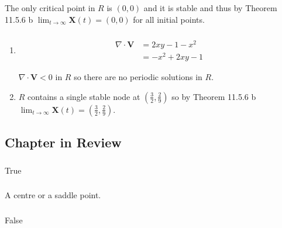 \documentclass{article}
\begin{document}
The only critical point in $R$ is $(0, 0)$ and it is stable and thus by Theorem 11.5.6 b $\lim_{t \rightarrow \infty} \mathbf{X}(t) = (0, 0)$ for all initial points.

\setcounter{subsubsection}{20}
\subsubsection{}

\begin{enumerate}
  \item

        \begin{align*}
          \nabla \cdot \mathbf{V} & = 2 x y - 1 - x^2  \\
                                  & = -x^2 + 2 x y - 1
        \end{align*}

        $\nabla \cdot \mathbf{V} < 0$ in $R$ so there are no periodic solutions in $R$.

  \item $R$ contains a single stable node at $\left( \frac{3}{2}, \frac{2}{9} \right)$ so by Theorem 11.5.6 b \\ $\lim_{t \rightarrow \infty} \mathbf{X}(t) = \left( \frac{3}{2}, \frac{2}{9} \right)$.
\end{enumerate}

\subsection{Chapter in Review}

\subsubsection{}

True

\setcounter{subsubsection}{2}
\subsubsection{}

A centre or a saddle point.

\setcounter{subsubsection}{4}
\subsubsection{}

False

\setcounter{subsubsection}{6}
\subsubsection{}
\end{document}
